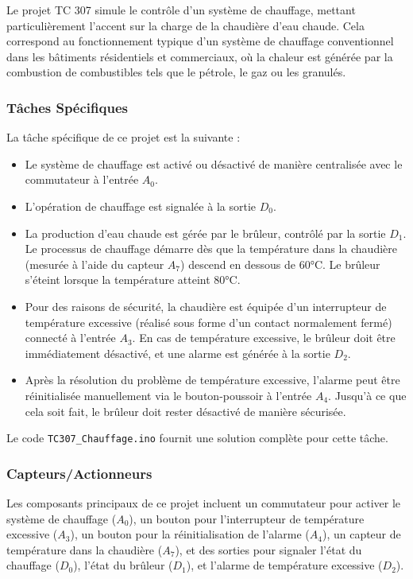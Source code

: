 \documentclass[a4paper,12pt]{report}
\begin{document}
Le projet TC 307 simule le contrôle d'un système de chauffage, mettant particulièrement l'accent sur la charge de la chaudière d'eau chaude. Cela correspond au fonctionnement typique d'un système de chauffage conventionnel dans les bâtiments résidentiels et commerciaux, où la chaleur est générée par la combustion de combustibles tels que le pétrole, le gaz ou les granulés.

\subsubsection{Tâches Spécifiques}

La tâche spécifique de ce projet est la suivante :
\begin{itemize}
    \item Le système de chauffage est activé ou désactivé de manière centralisée avec le commutateur à l'entrée \(A_0\).
    \item L'opération de chauffage est signalée à la sortie \(D_0\).
    \item La production d'eau chaude est gérée par le brûleur, contrôlé par la sortie \(D_1\). Le processus de chauffage démarre dès que la température dans la chaudière (mesurée à l'aide du capteur \(A_7\)) descend en dessous de 60°C. Le brûleur s'éteint lorsque la température atteint 80°C.
    \item Pour des raisons de sécurité, la chaudière est équipée d'un interrupteur de température excessive (réalisé sous forme d'un contact normalement fermé) connecté à l'entrée \(A_3\). En cas de température excessive, le brûleur doit être immédiatement désactivé, et une alarme est générée à la sortie \(D_2\).
    \item Après la résolution du problème de température excessive, l'alarme peut être réinitialisée manuellement via le bouton-poussoir à l'entrée \(A_4\). Jusqu'à ce que cela soit fait, le brûleur doit rester désactivé de manière sécurisée.
\end{itemize}
Le code \texttt{TC307\_Chauffage.ino} fournit une solution complète pour cette tâche.

\subsubsection{Capteurs/Actionneurs}

Les composants principaux de ce projet incluent un commutateur pour activer le système de chauffage (\(A_0\)), un bouton pour l'interrupteur de température excessive (\(A_3\)), un bouton pour la réinitialisation de l'alarme (\(A_4\)), un capteur de température dans la chaudière (\(A_7\)), et des sorties pour signaler l'état du chauffage (\(D_0\)), l'état du brûleur (\(D_1\)), et l'alarme de température excessive (\(D_2\)).
\end{document}
